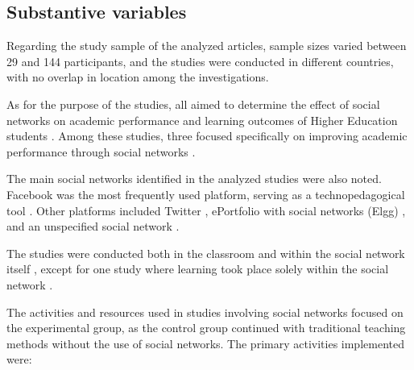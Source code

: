 \documentclass[english]{textolivre}
\begin{document}
\endgroup

\subsection{Substantive variables}
Regarding the study sample of the analyzed articles, sample sizes varied between 29 and 144 participants, and the studies were conducted in different countries, with no overlap in location among the investigations.

As for the purpose of the studies, all aimed to determine the effect of social networks on academic performance and learning outcomes of Higher Education students \cite{alexiou2020, almarzouki2022, demirbilek2018, penalba2020, perezsuasnavas2022, salasrueda2019, salasrueda2018, zulkifli2018}. Among these studies, three focused specifically on improving academic performance through social networks \cite{almarzouki2022, perezsuasnavas2022, salasrueda2019}.

The main social networks identified in the analyzed studies were also noted. Facebook was the most frequently used platform, serving as a technopedagogical tool \cite{demirbilek2018, penalba2020, salasrueda2019, salasrueda2018, zulkifli2018}. Other platforms included Twitter \cite{perezsuasnavas2022}, ePortfolio with social networks (Elgg) \cite{alexiou2020}, and an unspecified social network \cite{almarzouki2022}.

The studies were conducted both in the classroom and within the social network itself \cite{alexiou2020, almarzouki2022, demirbilek2018, penalba2020, perezsuasnavas2022, salasrueda2019, salasrueda2018}, except for one study where learning took place solely within the social network \cite{zulkifli2018}.

The activities and resources used in studies involving social networks focused on the experimental group, as the control group continued with traditional teaching methods without the use of social networks. The primary activities implemented were:
\end{document}
